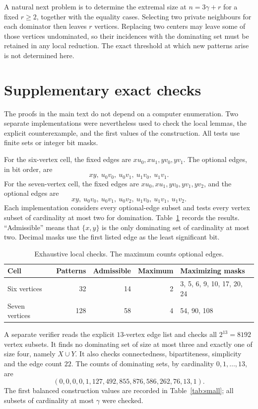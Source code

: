 \documentclass[11pt]{article}
\theoremstyle{definition}
\theoremstyle{remark}
\begin{document}
A natural next problem is to determine the extremal size at $n=3\gamma+r$
for a fixed $r\ge2$, together with the equality cases. Selecting two private
neighbours for each dominator then leaves $r$ vertices. Replacing two centers
may leave some of those vertices undominated, so their incidences with the
dominating set must be retained in any local reduction. The exact threshold
at which new patterns arise is not determined here.

\appendix
\section{Supplementary exact checks}\label{app:checks}

The proofs in the main text do not depend on a computer enumeration.
Two separate implementations were nevertheless used to check the local
lemmas, the explicit counterexample, and the first values of the construction.
All tests use finite sets or integer bit masks.

For the six-vertex cell, the fixed edges are $xu_0,xu_1,yv_0,yv_1$.
The optional edges, in bit order, are
\[
 xy,\ u_0v_0,\ u_0v_1,\ u_1v_0,\ u_1v_1.
\]
For the seven-vertex cell, the fixed edges are $xu_0,xu_1,yv_0,yv_1,yv_2$,
and the optional edges are
\[
 xy,\ u_0v_0,\ u_0v_1,\ u_0v_2,\ u_1v_0,\ u_1v_1,\ u_1v_2.
\]
Each implementation considers every optional-edge subset and tests every
vertex subset of cardinality at most two for domination. Table~\ref{tab:cells}
records the results. ``Admissible'' means that $\{x,y\}$ is the only dominating
set of cardinality at most two. Decimal masks use the first listed edge as
the least significant bit.

\begin{table}[htbp]
\centering
\small
\begin{tabular}{lrrrl}
\toprule
Cell & Patterns & Admissible & Maximum & Maximizing masks\\
\midrule
Six vertices & 32 & 14 & 2 & 3, 5, 6, 9, 10, 17, 20, 24\\
Seven vertices & 128 & 58 & 4 & 54, 90, 108\\
\bottomrule
\end{tabular}
\caption{Exhaustive local checks. The maximum counts optional edges.}
\label{tab:cells}
\end{table}

A separate verifier reads the explicit $13$-vertex edge list and checks all
$2^{13}=8192$ vertex subsets. It finds no dominating set of size at most three
and exactly one of size four, namely $X\cup Y$. It also checks connectedness,
bipartiteness, simplicity and the edge count $22$. The counts of dominating
sets, by cardinality $0,1,\ldots,13$, are
\[
 (0,0,0,0,1,127,492,855,876,586,262,76,13,1).
\]
The first balanced construction values are recorded in
Table~\ref{tab:small}; all subsets of cardinality at most $\gamma$ were checked.
\end{document}
